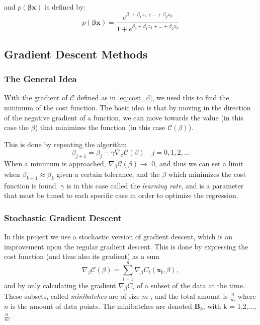 \noindent and $p(\boldsymbol{\beta}\boldsymbol{x})$ is defined by:
\begin{equation}
  p(\boldsymbol{\beta}\boldsymbol{x}) = \frac{e^{\beta_0 + \beta_1x_1 + ... + \beta_px_p}}{1+e^{\beta_0 + \beta_1x_1 + ... + \beta_px_p}}
  \label{eq:pBx}
\end{equation}

\subsection{Gradient Descent Methods}
\subsubsection*{The General Idea}
With the gradient of $\mathcal{C}$ defined as in \eqref{eq:cost_d}, we used this to find the minimum of the cost function. The basic idea is that by moving in the direction of the negative gradient of a function, we can move towards the value (in this case the $\beta$) that minimizes the function (in this case $\mathcal{C}(\beta)$). \cite{GDLectures}

This is done by repeating the algorithm
\begin{equation}
    \beta_{j+1} = \beta_j - \gamma \nabla_\beta \mathcal{C}(\beta) \quad j = 0,1,2,...
    \label{eq:gradient_decent}
\end{equation}
When a minimum is approached, $\nabla_\beta \mathcal{C}(\beta) \rightarrow$ 0, and thus we can set a limit when $\beta_{k+1} \approx \beta_k$ given a certain tolerance, and the $\beta$ which minimizes the cost function is found. $\gamma$ is in this case called the \textit{learning rate}, and is a parameter that must be tuned to each specific case in order to optimize the regression.

\subsubsection*{Stochastic Gradient Descent}
In this project we use a stochastic version of gradient descent, which is an improvement upon the regular gradient descent. This is done by expressing the cost function (and thus also its gradient) as a sum
\begin{equation}
    \nabla_\beta \mathcal{C}(\beta) = \sum_{i=1}^n     \nabla_\beta C_i(\boldsymbol{x_i},\beta) ,
    \label{eq:gradient_sum}
\end{equation}
and by only calculating the gradient $\nabla_{\beta} C_i$ of a subset of the data at the time. These subsets, called \textit{minibatches} are of size $m$ , and the total amount is $\frac{n}{m}$ where $n$ is the amount of data points. The minibatches are denoted $\boldsymbol{B}_k$, with k = 1,2,...,$\frac{n}{m}$.

